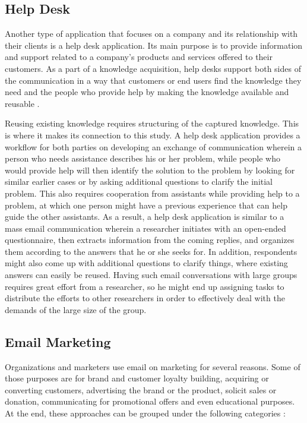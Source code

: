 \subsection{Help Desk}
\label{subsec:3.1.2:HelpDeskSoft}
Another type of application that focuses on a company and its relationship with their clients is a help desk application. Its main purpose is to provide information and support related to a company's products and services offered to their customers. As a part of a knowledge acquisition, help desks support both sides of the communication in a way that customers or end users find the knowledge they need and the people who provide help by making the knowledge available and reusable \citep{Halverson2004}.
\vspace{1cm}

Reusing existing knowledge requires structuring of the captured knowledge. This is where it makes its connection to this study. A help desk application provides a workflow for both parties on developing an exchange of communication wherein a person who needs assistance describes his or her problem, while people who would provide help will then identify the solution to the problem by looking for similar earlier cases or by asking additional questions to clarify the initial problem. This also requires cooperation from assistants while providing help to a problem, at which one person might have a previous experience that can help guide the other assistants. As a result, a help desk application is similar to a mass email communication wherein a researcher initiates with an open-ended questionnaire, then extracts information from the coming replies, and organizes them according to the answers that he or she seeks for. In addition, respondents might also come up with additional questions to clarify things, where existing answers can easily be reused. Having such email conversations with large groups requires great effort from a researcher, so he might end up assigning tasks to distribute the efforts to other researchers in order to effectively deal with the demands of the large size of the group.


\subsection{Email Marketing}
\label{subsec:3.1.3:EmaiMarkt}
Organizations and marketers use email on marketing for several reasons. Some of those purposes are for brand and customer loyalty building, acquiring or converting customers, advertising the brand or the product, solicit sales or donation, communicating for promotional offers and even educational purposes. At the end, these approaches can be grouped under the following categories \citep{Eley2009}:

